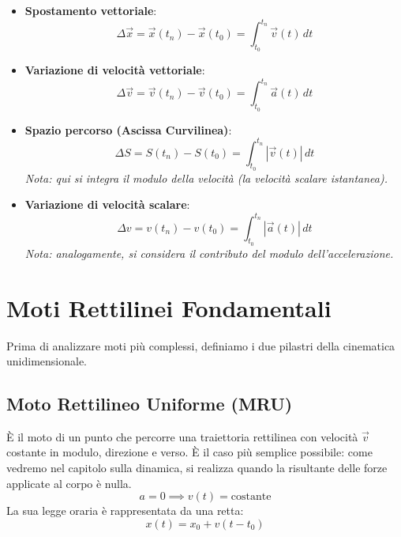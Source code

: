 \begin{itemize}
    \item \textbf{Spostamento vettoriale}:
    \begin{equation}
    \Delta \vec{x} = \vec{x}(t_n) - \vec{x}(t_0) = \int_{t_0}^{t_n} \vec{v}(t) \, dt
\end{equation}
    
    \item \textbf{Variazione di velocità vettoriale}:
    \begin{equation}
    \Delta \vec{v} = \vec{v}(t_n) - \vec{v}(t_0) = \int_{t_0}^{t_n} \vec{a}(t) \, dt
\end{equation}
    
    \item \textbf{Spazio percorso (Ascissa Curvilinea)}:
    \begin{equation}
    \Delta S = S(t_n) - S(t_0) = \int_{t_0}^{t_n} |\vec{v}(t)| \, dt
\end{equation}
    \textit{Nota: qui si integra il modulo della velocità (la velocità scalare istantanea).}
    
    \item \textbf{Variazione di velocità scalare}:
    \begin{equation}
    \Delta v = v(t_n) - v(t_0) = \int_{t_0}^{t_n} |\vec{a}(t)| \, dt
\end{equation}
    \textit{Nota: analogamente, si considera il contributo del modulo dell'accelerazione.}
\end{itemize}

\section{Moti Rettilinei Fondamentali}

Prima di analizzare moti più complessi, definiamo i due pilastri della cinematica unidimensionale.

\subsection{Moto Rettilineo Uniforme (MRU)}
È il moto di un punto che percorre una traiettoria rettilinea con velocità $\vec{v}$ costante in modulo, direzione e verso. È il caso più semplice possibile: come vedremo nel capitolo sulla dinamica, si realizza quando la risultante delle forze applicate al corpo è nulla.
\begin{equation}
    a = 0 \implies v(t) = \text{costante}
\end{equation}
La sua legge oraria è rappresentata da una retta:
\begin{equation}
    x(t) = x_0 + v(t - t_0)
\end{equation}

